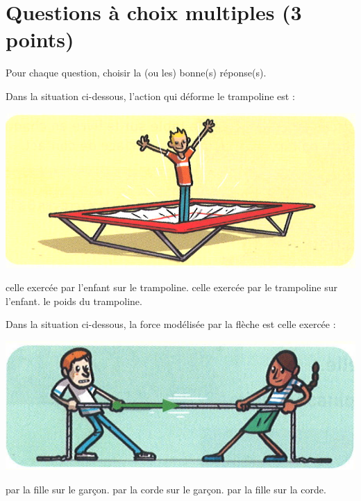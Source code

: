 \section{Questions à choix multiples (3 points)}\label{qcm}
Pour chaque question, choisir la (ou les) bonne(s) réponse(s).

\begin{questions}
	\question[1] Dans la situation ci-dessous, l'action qui déforme le trampoline est :
	
	\begin{multicols}{2}
	
		\begin{center}
			\includegraphics[scale=0.3]{trampo}	
		\end{center}
	
	
		\begin{checkboxes}
			\choice celle exercée par l'enfant sur le trampoline.
			\choice celle exercée par le trampoline sur l'enfant.
			\choice le poids du trampoline.
		\end{checkboxes}
	\end{multicols}

	\question[1] Dans la situation ci-dessous, la force modélisée par la flèche est celle exercée :
	
	\begin{multicols}{2}
		
			
		\begin{center}
			\includegraphics[scale=0.3]{corde}
		\end{center}
		\begin{checkboxes}
			\choice par la fille sur le garçon.
			\choice par la corde sur le garçon.
			\choice par la fille sur la corde.
		\end{checkboxes}
		

\end{multicols}
\end{questions}
